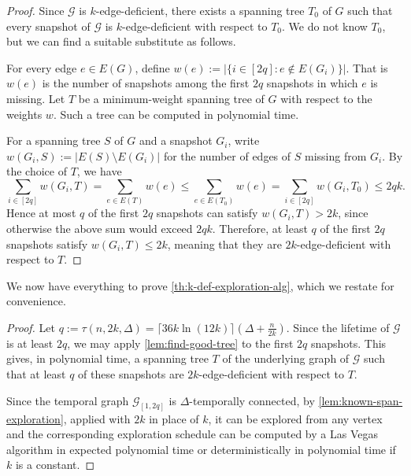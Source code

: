 \documentclass[a4paper,11pt]{article}
\theoremstyle{definition}
\theoremstyle{remark}
\newcommand{\cG}{\ensuremath{\mathcal{G}}}
\begin{document}
    \begin{proof}
        Since $\cG$ is $k$-edge-deficient, there exists a spanning tree $T_0$ of $G$ such that every snapshot of $\cG$ is $k$-edge-deficient with respect to $T_0$. We do not know $T_0$, but we can find a suitable substitute as follows.

        For every edge $e\in E(G)$, define
        $w(e) := \bigl|\{i\in[2q] : e\notin E(G_i)\}\bigr|$.
        That is $w(e)$ is the number of snapshots among the first $2q$ snapshots in which $e$ is missing. Let $T$ be a minimum-weight spanning tree of $G$ with respect to the weights $w$. Such a tree can be computed in polynomial time.

        For a spanning tree $S$ of $G$ and a snapshot $G_i$, write
        $w(G_i,S):=|E(S)\setminus E(G_i)|$
        for the number of edges of $S$ missing from $G_i$. By the choice of $T$, we have
        \[
            \sum_{i\in[2q]} w(G_i,T)
            =
            \sum_{e\in E(T)} w(e)
            \leq
            \sum_{e\in E(T_0)} w(e)
            =
            \sum_{i\in[2q]} w(G_i,T_0)
            \leq
            2qk.
        \]
        Hence at most $q$ of the first $2q$ snapshots can satisfy
        $w(G_i,T)>2k$,
        since otherwise the above sum would exceed $2qk$. Therefore, at least $q$ of the first $2q$ snapshots satisfy $w(G_i,T)\leq 2k$, meaning that they are $2k$-edge-deficient with respect to $T$.
    \end{proof}

    We now have everything to prove \cref{th:k-def-exploration-alg}, which we restate for convenience.

    \KDefExplorationAlg*
    \begin{proof}
        Let $q := \tau(n,2k,\Delta) = \lceil 36k \ln{(12k)} \rceil(\Delta+ \frac{n}{2k})$.
        Since the lifetime of $\cG$ is at least $2q$, we may apply \cref{lem:find-good-tree} to the first $2q$ snapshots. This gives, in polynomial time, a spanning tree $T$ of the underlying graph of $\cG$ such that at least $q$ of these snapshots are $2k$-edge-deficient with respect to $T$.

        Since the temporal graph $\cG_{[1,2q]}$ is $\Delta$-temporally connected, by \cref{lem:known-span-exploration}, applied with $2k$ in place of $k$, it can be explored from any vertex and the corresponding exploration schedule can be computed by a Las Vegas algorithm in expected polynomial time or deterministically in polynomial time if $k$ is a constant.
    \end{proof}
\end{document}
